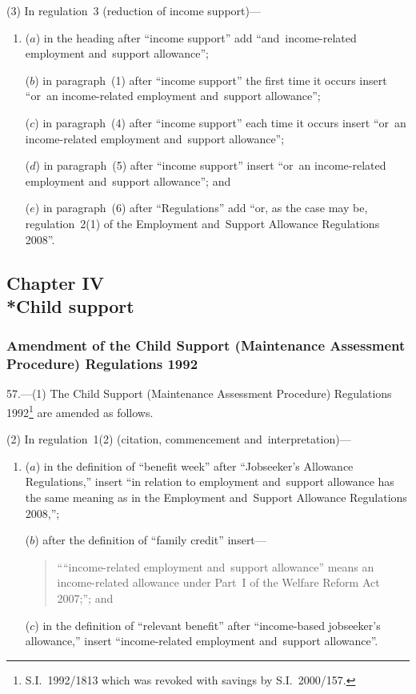 \documentclass[12pt,a4paper]{article}
\begin{document}
(3) In regulation~3 (reduction of income support)—
\begin{enumerate}\item[]
($a$) in the heading after “income support” add “and~income-related employment and~support allowance”;

($b$) in paragraph~(1) after “income support” the first time it occurs insert “or~an income-related employment and~support allowance”;

($c$) in paragraph~(4) after “income support” each time it occurs insert “or~an income-related employment and~support allowance”;

($d$) in paragraph~(5) after “income support” insert “or~an income-related employment and~support allowance”; and

($e$) in paragraph~(6) after “Regulations” add “or, as the case may be, regulation~2(1) of the Employment and~Support Allowance Regulations 2008”.
\end{enumerate}


\subsection[Chapter IV --- Child support]{Chapter IV\\*Child support}

\renewcommand\parthead{--- Part V Chapter IV}

\subsubsection[57. Amendment of the Child Support (Maintenance Assessment Procedure) Regulations 1992]{Amendment of the Child Support (Maintenance Assessment Procedure) Regulations 1992}

57.---(1)  The Child Support (Maintenance Assessment Procedure) Regulations 1992\footnote{S.I.~1992/1813 which was revoked with savings by S.I.~2000/157.} are amended as follows.

(2) In regulation~1(2) (citation, commencement and~interpretation)—
\begin{enumerate}\item[]
($a$) in the definition of “benefit week” after “Jobseeker’s Allowance Regulations,” insert “in relation to employment and~support allowance has the same meaning as in the Employment and~Support Allowance Regulations 2008,”;

($b$) after the definition of “family credit” insert—
\begin{quotation}\sloppy
““income-related employment and~support allowance” means an income-related allowance under Part~I of the Welfare Reform Act 2007;”; and
\end{quotation}

($c$) in the definition of “relevant benefit” after “income-based jobseeker’s allowance,” insert “income-related employment and~support allowance”.
\end{enumerate}
\end{document}
